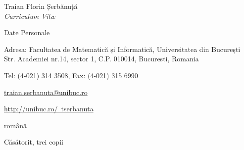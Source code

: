 \documentclass[10pt, romanian]{article}
\begin{document}
%

\newlength{\oldcvlabelwidth}
\setlength{\oldcvlabelwidth}{\cvlabelwidth}

\renewcommand*{\cvbibname}{}

\begin{cv}{Traian Florin Șerbănuță\\{\large \itshape Curriculum Vit\ae}}

\begin{cvlist}{Date Personale}
   \setlength{\itemsep}{-1ex}
    \item[Date de contact] Adresa: Facultatea de Matematică și Informatică, Universitatea din București
    \\Str. Academiei nr.14, sector 1, C.P. 010014, Bucuresti, Romania
    \item Tel: (4-021) 314 3508, Fax: (4-021) 315 6990
    \item \href{mailto:traian.serbanuta@unibuc.ro}{traian.serbanuta@unibuc.ro}
    \item \href{http://unibuc.ro/~tserbanuta}
    {http://unibuc.ro/~tserbanuta}
       \setlength{\itemsep}{0ex}
\item[Cetățenie] română
\item[Stare Civilă] Căsătorit, trei copii
\end{cvlist}


\end{cv}
\end{document}
